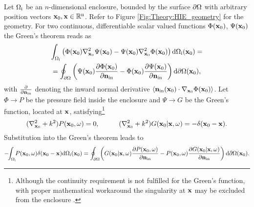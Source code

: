 Let $\Omega_{\mathrm{i}}$ be an $n$-dimensional enclosure, bounded by the surface $\partial \Omega$ with arbitrary position vectors $\mathbf{x}_0, \mathbf{x} \in \mathbb{R}^{\mathrm{n}}$. 
Refer to Figure \ref{Fig:Theory:HIE_geometry} for the geometry. 
For two continuous, differentiable scalar valued functions $\Phi(\mathbf{x}_0)$, $\Psi(\mathbf{x}_0)$ the Green's theorem reads as
\begin{multline}
\int_{\Omega_{\mathrm{i}}}
\left(  \Phi(\mathbf{x}_0) \nabla^2_{\mathbf{x}_0} \Psi(\mathbf{x}_0) - \Psi(\mathbf{x}_0) \nabla^2_{\mathbf{x}_0} \Phi(\mathbf{x}_0)   \right)   \mathrm{d} \Omega_{\mathrm{i}}(\mathbf{x}_0)=  \\  =
\oint_{\partial \Omega}  \left(  \Psi(\mathbf{x}_0) \frac{\partial \Phi(\mathbf{x}_0)}{\partial \mathbf{n}_{\mathrm{in}}}  - \Phi(\mathbf{x}_0) \frac{\partial \Psi(\mathbf{x}_0)}{\partial \mathbf{n}_{\mathrm{in}}}  \right)   \mathrm{d} \partial \Omega(\mathbf{x}_0),
\label{Eq:Theory:Greens-theorem}
\end{multline}
with $\frac{\partial}{\partial \mathbf{n}_{\mathrm{in}}}$ denoting the inward normal derivative $\langle \mathbf{n}_{\mathrm{in}}(\mathbf{x}_0) \cdot \nabla_{\mathbf{x}_0} \Phi(\mathbf{x}_0) \rangle$.
Let $\Phi \rightarrow P$ be the pressure field inside the enclosure and $\Psi \rightarrow G$ be the Green's function, located at $\mathbf{x}$, satisfying\footnote{Although the continuity requirement is not fulfilled for the Green's function, with proper mathematical workaround the singularity at $\mathbf{x}$ may be excluded from the enclosure \cite{Williams1999}.}
\begin{equation}
(\nabla_{\vxo}^2 + k^2)P(\vxo,\omega) = 0, \hspace{10mm}
(\nabla_{\vxo}^2 + k^2)G(\vxo|\vx,\omega) = -\delta(\vxo - \vx).
\end{equation}
Substitution into the Green's theorem leads to
\begin{equation}
\small
-\!\! \int_{\Omega_{\mathrm{i}}} \!\!P(\mathbf{x}_0,\omega) \delta(\mathbf{x}_0 - \mathbf{x})
  \mathrm{d} \Omega_{\mathrm{i}}(\mathbf{x}_0) = 
\oint_{\partial \Omega} \! \left( G(\mathbf{x}_0|\mathbf{x},\omega) \frac{\partial P(\mathbf{x}_0,\omega)}{\partial \mathbf{n}_{\mathrm{in}}}  - P(\mathbf{x}_0,\omega)  \frac{\partial G(\mathbf{x}_0|\mathbf{x},\omega)}{\partial \mathbf{n}_{\mathrm{in}}} \right) \mathrm{d} \partial \Omega(\mathbf{x}_0).
\end{equation}

